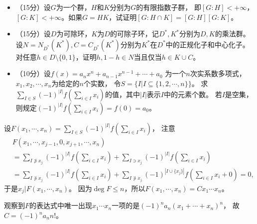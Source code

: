 \begin{itemize}
    \item[(四)]（15分）设$G$为一个群，$H$和$K$分别为$G$的有限指数子群，
    即$[G:H]<+\infty$，$[G:K]<+\infty$。如果$G=HK$，试证明$[G:H\cap K]=[G:H][G:K]$。

    \item[(五)]（15分）设$D$为可除环，$K$为$D$的可除子环，记$D^*,K^*$分别为$D,K$的乘法群。
    设$N=N_{D^*}(K^*),C=C_{D^*}(K^*)$分别为$K^*$在$D^*$中的正规化子和中心化子。
    对任意$h\in D\setminus\{0,1\}$，证明$h,1-h\in N$当且仅当$h\in K\cup C$。

    \item[(六)]（10分）设$f(x)=a_nx^n+a_{n-1}x^{n-1}+\cdots+a_0$
    为一个$n$次实系数多项式，$x_1,x_2,\cdots,x_n$为给定的$n$个实数，
    令$S=\{I|I\subseteq\{1,2,\cdots,n\}\}$。
    求$\sum_{I\in S}(-1)^{|I|}f(\sum_{i\in I}x_i)$的值，其中$|I|$表示$I$中的元素个数。
    若$I$是空集，则规定$(-1)^{|I|}f(\sum_{i\in I}x_i)=f(0)=a_0$。

\end{itemize}
\begin{proofc}[（六）\ 解答]
    设$F(x_1,\cdots,x_n)=\sum_{I\in S}(-1)^{|I|}f(\sum_{i\in I}x_i)$，
    注意\begin{align*}
        &\textstyle F(x_1,\cdots,x_{j-1},0,x_{j+1},\cdots,x_n)\\
        &\textstyle =\sum_{I\notni x_j}(-1)^{|I|}f(\sum_{i\in I}x_i)
        +\sum_{I\ni x_j}(-1)^{|I|}f(\sum_{i\in I}x_i)\\
        &\textstyle =\sum_{I\notni x_j}(-1)^{|I|}f(\sum_{i\in I}x_i)
        +\sum_{I\notni x_j}(-1)^{|I\cup\{x_j\}|}f(\sum_{i\in I}x_i+0)=0,
    \end{align*}
    于是$x_j|F(x_1,\cdots,x_n)$。
    因为$\deg F\le n$，所以$F(x_1,\cdots,x_n)=Cx_1\cdots x_n$。

    观察到$F$的表达式中唯一出现$x_1\cdots x_n$一项的是$(-1)^na_n(x_1+\cdots+x_n)^n$，
    故$C=(-1)^na_nn!$。
\end{proofc}

